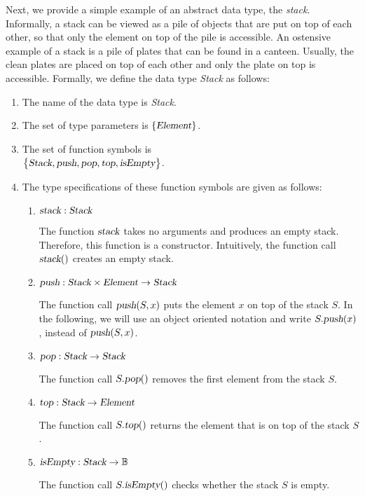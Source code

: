Next, we provide a simple example of an abstract data type, the \emph{stack}.
Informally, a stack can be viewed as a pile of objects that are put on top of each other, so that
only the element on top of the pile is accessible.  An ostensive example of a stack is a pile of
plates that can be found in a canteen.  Usually, the clean plates are placed on top of each other
and only the plate on top is accessible.  Formally, we define the data type \textsl{Stack} as follows:
\begin{enumerate}
\item The name of the data type is \textsl{Stack}.
\item The set of type parameters is $\{ \textsl{Element} \}$.
\item The set of function symbols is \\[0.2cm]
      \hspace*{1.3cm} 
      $\bigl\{ \textsl{Stack}, \textsl{push}, \textsl{pop}, \textsl{top}, \textsl{isEmpty} \bigr\}$.
\item The type specifications of these function symbols are given as follows:
      \begin{enumerate}
      \item $\textsl{stack}: \textsl{Stack}$

            The function $\textsl{stack}$ takes no arguments and produces an empty stack.
            Therefore, this function is a constructor.  Intuitively, the function call $\textsl{stack}()$ 
            creates an empty stack.
      \item $\textsl{push}: \textsl{Stack} \times \textsl{Element} \rightarrow \textsl{Stack}$

            The function call $\textsl{push}(S,x)$ puts the element $x$ on top of the stack $S$.  In
            the following, we will use an object oriented notation and write 
            $S.\textsl{push}(x)$, instead of $\textsl{push}(S,x)$.
      \item $\textsl{pop}: \textsl{Stack}  \rightarrow \textsl{Stack}$

            The function call $S.\textsl{pop}()$ removes the first element from the stack $S$.
      \item $\textsl{top}: \textsl{Stack} \rightarrow \textsl{Element}$

            The function call $S.\textsl{top}()$ returns the element that is on top of the stack $S$. 
      \item $\textsl{isEmpty}: \textsl{Stack} \rightarrow \mathbb{B}$

            The function call $S.\textsl{isEmpty}()$ checks whether the stack $S$ is empty.
      \end{enumerate}
\end{enumerate}
